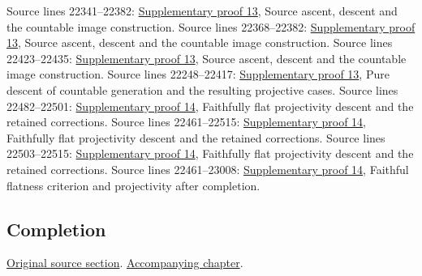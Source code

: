 \begin{AlgebraSourceRoutes}
 Source lines 22341--22382: \hyperlink{algebra_ml_coherent_notes_20260927}{Supplementary proof 13}, Source ascent, descent and the countable image construction.
 Source lines 22368--22382: \hyperlink{algebra_ml_coherent_notes_20260927}{Supplementary proof 13}, Source ascent, descent and the countable image construction.
 Source lines 22423--22435: \hyperlink{algebra_ml_coherent_notes_20260927}{Supplementary proof 13}, Source ascent, descent and the countable image construction.
 Source lines 22248--22417: \hyperlink{algebra_ml_coherent_notes_20260927}{Supplementary proof 13}, Pure descent of countable generation and the resulting projective cases.
 Source lines 22482--22501: \hyperlink{algebra_projectivity_completion_notes_20260927}{Supplementary proof 14}, Faithfully flat projectivity descent and the retained corrections.
 Source lines 22461--22515: \hyperlink{algebra_projectivity_completion_notes_20260927}{Supplementary proof 14}, Faithfully flat projectivity descent and the retained corrections.
 Source lines 22503--22515: \hyperlink{algebra_projectivity_completion_notes_20260927}{Supplementary proof 14}, Faithfully flat projectivity descent and the retained corrections.
 Source lines 22461--23008: \hyperlink{algebra_projectivity_completion_notes_20260927}{Supplementary proof 14}, Faithful flatness criterion and projectivity after completion.
\end{AlgebraSourceRoutes}

\subsection{Completion}
\hypertarget{algebra-source-section-completion}{}
\noindent\href{https://github.com/stacks/stacks-project/blob/a04446e57ec1fbc252a871afcec7752fb2807b14/algebra.tex\#L22528}{Original source section}. \href{algebra.pdf\#nameddest=section-completion}{Accompanying chapter}.

